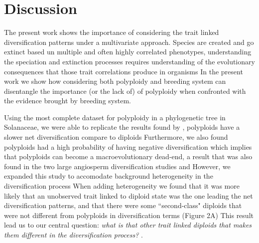 \section{Discussion}


The present work shows the importance of considering the trait linked diversification patterns under a multivariate approach.
Species are created and go extinct based un multiple and often highly correlated phenotypes, understanding the speciation and extinction processes requires understanding of the evolutionary consequences that those trait correlations produce in organisms
In the present work we show how considering both polyploidy and breeding system can disentangle the importance (or the lack of) of polyploidy when confronted with the evidence brought by breeding system.\newline

Using the most complete dataset for polyploidy in a phylogenetic tree in Solanaceae, we were able to replicate the results found by \citet{mayrose_2011}, polyploids have a slower net diversification compare to diploids
Furthermore,  we also found polyploids had a high probability of having negative diversification which implies that polyploids can become a macroevolutionary dead-end, a result that was also found in the two large angiosperm diversification studies  \citet{mayrose_2011} and \citet{mayrose_2015}
However, we expanded this study to accomodate  background heterogeneity in the diversification process
When adding heterogeneity we found that it was more likely that an unobserved trait linked to diploid state was the one leading the net diversification patterns, and that there were some ``second-class" diploids that were not different from polyploids in diversification terms (Figure 2A)
This result lead us to our central question: \textit{what is that other trait linked diploids that makes them different in the diversification process? }.\newline

